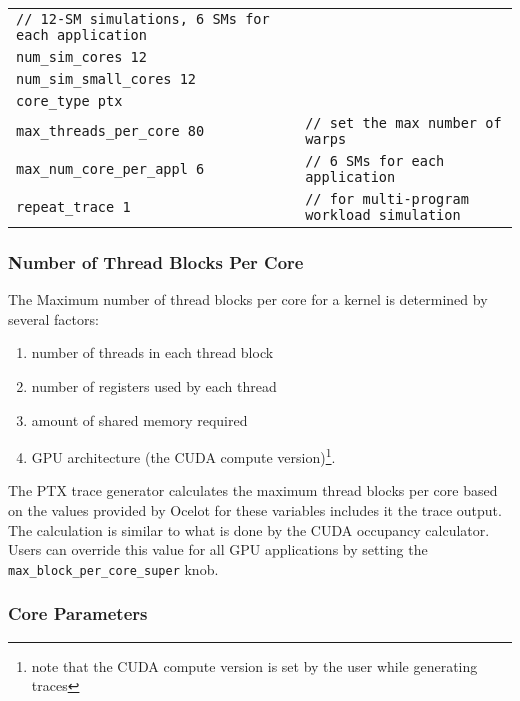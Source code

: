 \begin{tabular}{l l}
 \Verb+// 12-SM simulations, 6 SMs for each application+ & \Verb++ \\
 \Verb+num_sim_cores 12+ & \Verb++ \\
 \Verb+num_sim_small_cores 12+ & \Verb++ \\
 \Verb+core_type ptx+ & \Verb++ \\
 \Verb+max_threads_per_core 80+ & \Verb+// set the max number of warps + \\
 \Verb+max_num_core_per_appl 6+ & \Verb+// 6 SMs for each application+ \\
 \Verb+repeat_trace 1+ & \Verb+// for multi-program workload simulation+
\end{tabular}

\subsubsection{Number of Thread Blocks Per Core}

The Maximum number of thread blocks per core for a kernel is determined by
several factors: 
\begin{enumerate}
 \item number of threads in each thread block
 \item number of registers used by each thread
 \item amount of shared memory required
 \item GPU architecture (the CUDA compute version)\footnote{note that the CUDA 
 compute version is set by the user while generating traces}.
\end{enumerate}
\noindent The PTX trace generator calculates the maximum thread blocks per core based on the 
values provided by Ocelot for these variables includes it the trace output. The
calculation is similar to what is done by the CUDA occupancy calculator. Users
can override this value for all GPU applications by setting the
\Verb+max_block_per_core_super+ knob.

\subsubsection{\gpu Core Parameters}

